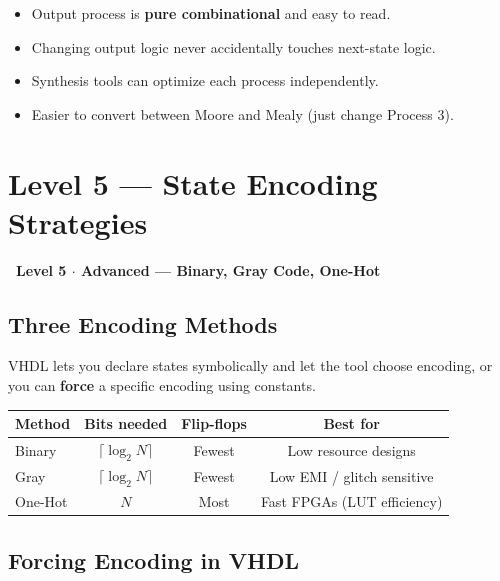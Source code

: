 \documentclass[12pt,a4paper]{article}
\newcommand{\faUnlock}{\ding{109}}
\newcommand{\levelbadge}[2]{%
  \begin{tcolorbox}[colback=#2!15, colframe=#2, arc=20pt,
    left=4pt, right=4pt, top=2pt, bottom=2pt,
    width=\linewidth, boxrule=1pt]
    \centering\sffamily\bfseries\large #1
  \end{tcolorbox}%
}
\begin{document}
\begin{tcolorbox}[notebox, title={3-Process Advantages}]
  \begin{itemize}
    \item Output process is \textbf{pure combinational} and easy to read.
    \item Changing output logic never accidentally touches next-state logic.
    \item Synthesis tools can optimize each process independently.
    \item Easier to convert between Moore and Mealy (just change Process 3).
  \end{itemize}
\end{tcolorbox}

\newpage

\section{Level 5 --- State Encoding Strategies}

\levelbadge{\faUnlock\ Level 5 $\cdot$ Advanced --- Binary, Gray Code, One-Hot}{accentred!70!black}

\subsection{Three Encoding Methods}

VHDL lets you declare states symbolically and let the tool choose encoding,
or you can \textbf{force} a specific encoding using constants.

\begin{center}
\begin{tabular}{lccc}
  \toprule
  \textbf{Method} & \textbf{Bits needed} & \textbf{Flip-flops} & \textbf{Best for} \\
  \midrule
  Binary   & $\lceil \log_2 N \rceil$ & Fewest    & Low resource designs \\
  Gray     & $\lceil \log_2 N \rceil$ & Fewest    & Low EMI / glitch sensitive \\
  One-Hot  & $N$                      & Most      & Fast FPGAs (LUT efficiency) \\
  \bottomrule
\end{tabular}
\end{center}

\subsection{Forcing Encoding in VHDL}
\end{document}
